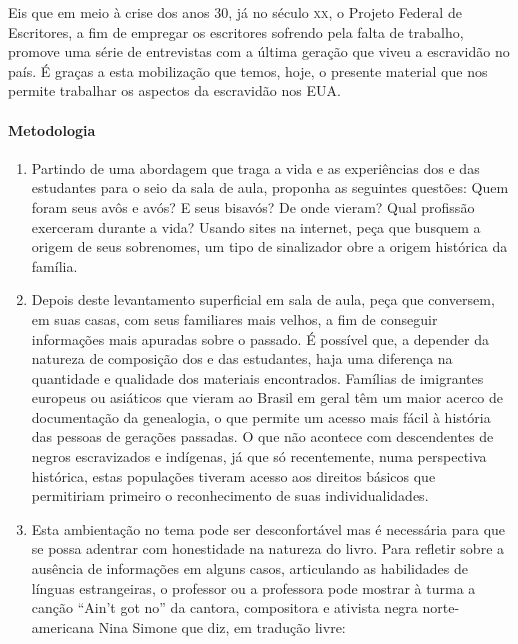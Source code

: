 \documentclass[11pt]{extarticle}
\begin{document}
Eis que em meio à crise dos anos 30, já no século \textsc{xx}, o Projeto Federal de Escritores, a fim de 
empregar os escritores sofrendo pela falta de trabalho, promove uma série de entrevistas com a
última geração que viveu a escravidão no país. É graças a esta mobilização que temos, hoje, 
o presente material que nos permite trabalhar os aspectos da escravidão nos EUA. 

\paragraph{Metodologia}

\begin{enumerate}

  \item
  Partindo de uma abordagem que traga a vida e as experiências dos e das estudantes para
  o seio da sala de aula, proponha as seguintes questões: Quem foram seus avôs e avós?
  E seus bisavós? De onde vieram? Qual profissão exerceram durante a vida? 
  Usando sites na internet, peça que busquem a origem de seus sobrenomes, um tipo
  de sinalizador obre a origem histórica da família. 

  \item
  Depois deste levantamento superficial em sala de aula, peça que conversem, em suas
  casas, com seus familiares mais velhos, a fim de conseguir informações mais apuradas
  sobre o passado. É possível que, a depender da natureza de composição dos e das estudantes, 
  haja uma diferença na quantidade e qualidade dos
  materiais encontrados. Famílias de imigrantes europeus ou asiáticos que vieram
  ao Brasil em geral têm um maior acerco de documentação da genealogia, o que
  permite um acesso mais fácil à história das pessoas de gerações passadas. 
  O que não acontece com descendentes de negros escravizados e indígenas, já
  que só recentemente, numa perspectiva histórica, estas populações tiveram acesso 
  aos direitos básicos que permitiriam primeiro o reconhecimento de suas
  individualidades. 

  \item
  Esta ambientação no tema pode ser desconfortável mas é necessária para 
  que se possa adentrar com honestidade na natureza do livro. Para refletir
  sobre a ausência de informações em alguns casos, articulando as habilidades de 
  línguas estrangeiras, o professor ou a professora pode mostrar à turma a canção 
  ``Ain't got no'' da cantora, compositora e ativista negra norte-americana 
  Nina Simone que diz, em tradução livre:

\end{enumerate}
\end{document}
